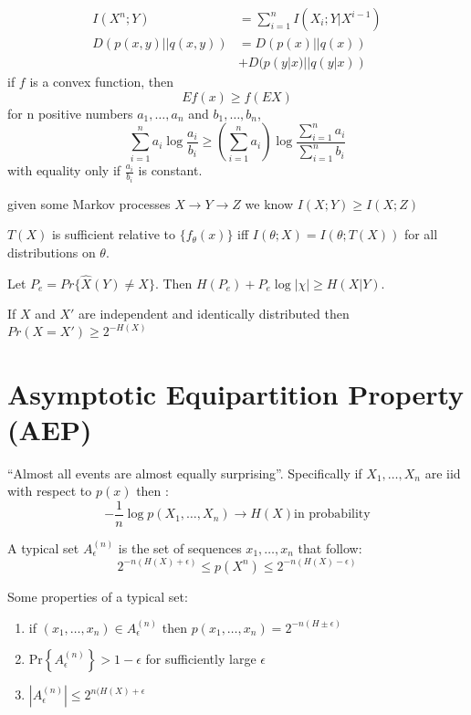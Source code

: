 \documentclass[10pt]{article}
\begin{document}
\begin{tiny}
\begin{multicols}{3}
\begin{align}
I(X^n;Y)&=\sum_{i=1}^n I(X_i;Y|X^{i-1})\\
D(p(x,y)||q(x,y))&=D(p(x)||q(x))\\
&+D(p(y|x)||q(y|x))
\end{align}
 \label{thm: jensen}
if $f$ is a convex function, then
\begin{equation}
Ef(x) \geq f(EX)
\end{equation}
 \label{thm: log sum}
for n positive numbers $a_1,\ldots,a_n$ and $b_1,\ldots,b_n$,
\begin{equation}
\sum_{i=1}^n a_i \log \frac{a_i}{b_i} \geq \left( \sum_{i=1}^n a_i \right) \log \frac{\sum_{i=1}^n a_i}{\sum_{i=1}^n b_i}
\end{equation}
with equality only if $\frac{a_i}{b_i}$ is constant. 

 \label{thm: data processing} 
given some Markov processes $X\rightarrow Y\rightarrow Z$ we know
\( I(X;Y) \geq I(X;Z) \)

 \label{thm: suff stats}
$T(X)$ is sufficient relative to $\{f_\theta (x)\}$ iff $I(\theta;X)=I(\theta;T(X))$ for all distributions on $\theta$.

 \label{thm: fano}
Let $P_e=Pr\{\hat{X}(Y)\neq X\}$. Then $H(P_e)+P_e \log |\chi| \geq H(X|Y)$.

\thm[Inequality] \label{thm: Ineq}
If $X$ and $X'$ are independent and identically distributed then $Pr(X=X') \geq 2^{-H(X)}$


\section*{Asymptotic Equipartition Property (AEP)}
``Almost all events are almost equally surprising''. Specifically if $X_1,\ldots,X_n$ are iid with respect to $p(x)$ then :
\begin{equation}
-\frac{1}{n}\log p(X_1,\ldots,X_n)\rightarrow H(X) \text{in probability}
\end{equation}

A typical set $A_\epsilon^{(n)}$ is the set of sequences $x_1,\ldots, x_n$ that follow:
\begin{equation}
2^{-n(H(X)+\epsilon)}\leq p(X^n)\leq 2^{-n(H(X)-\epsilon)}
\end{equation}

Some properties of a typical set:
\begin{enumerate}
\item if $(x_1,\ldots,x_n) \in A_\epsilon^{(n)}$ then $p(x_1,\ldots,x_n) = 2^{-n(H\pm \epsilon)}$
\item Pr$\left\{A_\epsilon^{(n)}\right\}>1-\epsilon$ for sufficiently large $\epsilon$
\item $|A_\epsilon^{(n)}| \leq 2^{n(H(X)+\epsilon}$
\end{enumerate}


\end{multicols}
\end{tiny}
\end{document}
